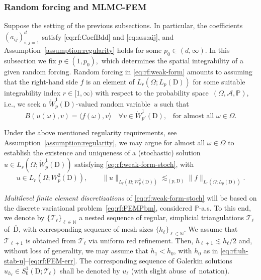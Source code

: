 \documentclass[reqno]{amsart}
\numberwithin{equation}{section}
\newcommand{\bbN}{\mathbb{N}}
\newcommand{\bbP}{\mathbb{P}}
\newcommand{\cA}{\mathcal{A}}
\newcommand{\cT}{\mathcal{T}}
\newcommand{\norm}[2]{     \| #1       \|_{ #2 }}
\newcommand{\duality}[1]{     \langle #1       \rangle}
\newcommand{\dom}{\mathrm{D}}
\newcommand{\Wo}{\mathring{W}}
\theoremstyle{remark}
\theoremstyle{definition}
\begin{document}
\subsubsection{Random forcing and MLMC-FEM} 

Suppose the setting of the previous 
subsections. In particular, 
the coefficients $(a_{ij})_{i,j=1}^d$ satisfy 
\eqref{eq:rf:CoefBdd} and \eqref{eq:ass:aij}, 
and Assumption~\ref{assumption:regularity} holds 
for some $p_0\in(d,\infty)$. 
In this subsection we fix $p\in(1,p_0)$,~which 
determines the spatial integrability 
of a given random forcing. 
%
Random forcing in \eqref{eq:rf:weak-form} 
amounts to assuming that 
the right-hand side $f$ is an element of  
$L_r(\Omega;L_p(\dom))$  
for some suitable integrability index ${r\in[1,\infty)}$ 
with respect to the probability space~$(\Omega,\cA,\bbP)$, i.e., 
we seek a $\Wo^1_p(\dom)$-valued random variable~$u$ 
such that 
% 
\begin{equation}\label{eq:rf:weak-form-stoch} 
B(u(\omega),v) = \duality{ f(\omega),v }  
\quad 
\forall v\in  \Wo^1_{p'}(\dom),
\;\;\; 
\text{for almost all }
\omega\in\Omega. 
\end{equation}

Under the above mentioned regularity 
requirements, see Assumption~\ref{assumption:regularity}, 
we may argue for almost all $\omega\in\Omega$  
to establish the existence and uniqueness 
of a (stochastic) solution~$u\in L_r(\Omega;\Wo^1_p(\dom))$ 
satisfying \eqref{eq:rf:weak-form-stoch}, 
with
%
\[ 
u \in L_r(\Omega; W^2_p(\dom)), 
\qquad 
\norm{ u }{L_r(\Omega; W^2_p(\dom)) }  
\lesssim_{(p,\dom)} 
\norm{ f }{L_r(\Omega; L_p(\dom)) }  . 
\] 
%

\emph{Multilevel finite element discretizations} 
of \eqref{eq:rf:weak-form-stoch} will be based on the 
discrete variational problem~\eqref{eq:rf:FEMPbm}, 
considered $\bbP$-a.s.
To this end, we denote by $\{ \cT_\ell \}_{\ell\in\bbN}$ 
a nested sequence of regular, simplicial triangulations 
$\cT_\ell$ of~$\overline{\dom}$, 
with corresponding sequence of mesh sizes  
$\{ h_\ell \}_{\ell \in\bbN}$. 
We assume that 
$\cT_{\ell+1}$ is obtained from $\cT_\ell$ 
via uniform red refinement. 
Then, $h_{\ell+1} \lesssim h_\ell /2$  
and, without loss of generality, 
we may assume that $h_1 < h_0$, 
with $h_0$ as in \eqref{eq:rf:uh-stab-u}--\eqref{eq:rf:FEM-err}.
%
The corresponding sequence of 
Galerkin solutions 
$u_{h_\ell} \in S^1_0(\dom;\cT_\ell)$ 
shall be denoted by $u_\ell$ 
(with slight abuse~of~notation). 
\end{document}
